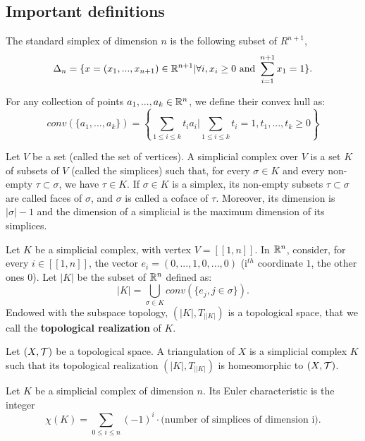 \subsection{Important definitions}

\begin{definition}
    The standard simplex of dimension $n$ is the following subset of
    $R^{n+1}$, 
    $$\Delta_n = \{x = (x_1, ..., x_{n+1}) \in \mathbb{R}^{n+1} | \forall i, x_i \ge 0
    \text{ and } \sum_{i=1}^{n+1} x_1 = 1\}.$$

    For any collection of points $a_1, ..., a_k \in \mathbb{R}^n$, we define their
    convex hull as:
    $$  
    conv(\{a_1, ..., a_k\}) = \left\{\sum_{1\le i \le k} t_i a_i | \sum_{1 \le i \le k} t_i = 1, t_1, ..., t_k \ge 0\right\}
    $$
\end{definition}

\begin{definition}
    Let $V$ be a set (called the set of vertices). A simplicial complex over
    $V$ is a set $K$ of subsets of $V$ (called the simplices) such that, for
    every $\sigma \in K$ and every non-empty $\tau \subset \sigma$, we have
    $\tau \in K$. If $\sigma \in K$ is a simplex, its non-empty subsets $\tau
    \subset \sigma$ are called faces of $\sigma$, and $\sigma$ is called a
    coface of $\tau$. Moreover, its dimension is $|\sigma| - 1$ and the
    dimension of a simplicial is the maximum dimension of its simplices. 
\end{definition}

\begin{definition}
    Let $K$ be a simplicial complex, with vertex $V = [\![1,n]\!]$. In
    $\mathbb{R}^{n}$, consider, for every $i \in [\![1,n]\!]$, the vector $e_i = (0,
    ..., 1, 0, ..., 0)$ (i$^{th}$ coordinate $1$, the other ones $0$). Let
    $|K|$ be the subset of $\mathbb{R}^{n}$ defined as: 
    $$|K| = \bigcup_{\sigma \in K} conv(\{e_j , j \in \sigma\}).$$ Endowed with the subspace topology, $(|K| , T_{||K|}
)$ is a topological space, that we call the \textbf{topological realization} of $K$.
\end{definition}

\begin{definition}
    Let $(X, \mathcal{T})$ be a topological space. A triangulation of $X$ is a
    simplicial complex $K$ such that its topological realization $(|K| , T_{||K|})$ is homeomorphic to $(X, \mathcal{T})$.
\end{definition}

\begin{definition}
    Let $K$ be a simplicial complex of dimension $n$. Its Euler characteristic
    is the integer
    $$\chi(K) = \sum_{0 \le i \le n} (-1)^i \cdot \text{(number of simplices
    of dimension i)}.$$
\end{definition}

